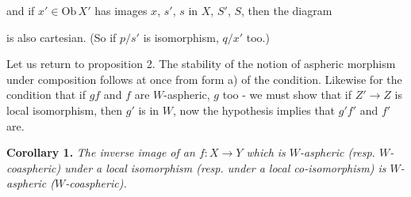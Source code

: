 \documentclass[11pt,leqno]{article}
\newcommand{\printedpage}[1]{\marginpar{\footnotesize p.~#1}}
\newcommand{\msp}[1]{\marginpar{\footnotesize [#1]}}
\newcommand{\Ob}{\mathrm{Ob}\,}
\begin{document}
\begin{center}
\end{center}

and if $x' \in \Ob X'$ has images $x$, $s'$, $s$ in $X$, $S'$, $S$, then the diagram

\begin{center}
\end{center}

is also cartesian. (So if $p/s'$ is isomorphism, $q/x'$ too.)

\printedpage{21}

\msp{page 25}Let us return to proposition 2. The stability of the notion of aspheric morphism under composition follows at once from form a) of the condition. Likewise for the condition that if $gf$ and $f$ are $W$-aspheric, $g$ too - we must show that if $Z' \longrightarrow Z$ is local isomorphism, then $g'$ is in $W$, now the hypothesis implies that $g'f'$ and $f'$ are.

\begin{center}
\end{center}

\textbf{Corollary 1.} \textit{The inverse image of an $f : X \longrightarrow Y$ which is $W$-aspheric (resp. $W$-coaspheric) under a local isomorphism (resp. under a local co-isomorphism) is $W$-aspheric ($W$-coaspheric).}

\begin{center}
\end{center}
\end{document}
